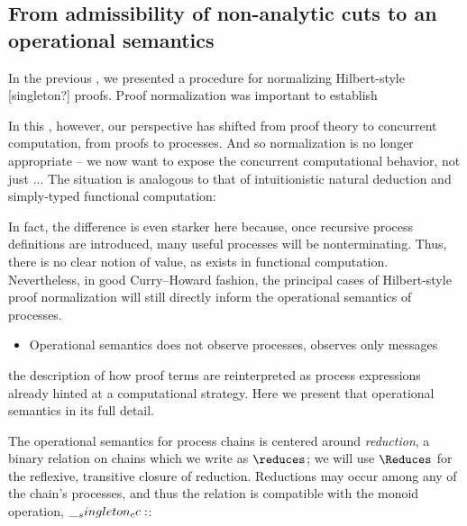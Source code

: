 \subsection{From admissibility of non-analytic cuts to an operational semantics}

In the previous , we presented a procedure for normalizing Hilbert-style [singleton?] proofs.
Proof normalization was important to establish

In this , however, our perspective has shifted from proof theory to concurrent computation, from proofs to processes.
And so normalization is no longer appropriate -- we now want to expose the concurrent computational behavior, not just ...
The situation is analogous to that of intuitionistic natural deduction and simply-typed functional computation:

In fact, the difference is even starker here because, once recursive process definitions are introduced, many useful processes will be nonterminating.
Thus, there is no clear notion of value, as exists in functional computation.
Nevertheless, in good Curry--Howard fashion, the principal cases of Hilbert-style proof normalization will still directly inform the operational semantics of processes.

\begin{itemize}
\item Operational semantics does not observe processes, observes only messages
\end{itemize}

 the description of how proof terms are reinterpreted as process expressions already hinted at a computational strategy.
Here we present that operational semantics in its full detail.


The operational semantics for process chains is centered around \emph{reduction}, a binary relation on chains which we write as $\reduces$;
we will use $\Reduces$ for the reflexive, transitive closure of reduction.
Reductions may occur among any of the chain's processes, and thus the relation is compatible with the monoid operation, $\__singleton_cc:$:


